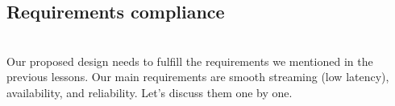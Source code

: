 

\subsection{Requirements compliance}\label{jI6qhBMUAVP5yyxVPTw9i}
\\
Our proposed design needs to fulfill the requirements we mentioned in the previous lessons. Our main requirements are smooth streaming (low latency), availability, and reliability. Let's discuss them one by one.

